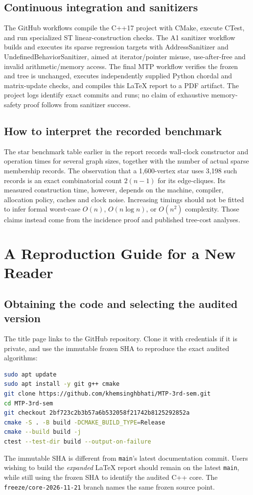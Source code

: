 \subsection{Continuous integration and sanitizers}
The GitHub workflows compile the C++17 project with CMake, execute CTest, and run specialized ST linear-construction checks.  The A1 sanitizer workflow builds and executes its sparse regression targets with AddressSanitizer and UndefinedBehaviorSanitizer, aimed at iterator/pointer misuse, use-after-free and invalid arithmetic/memory access.  The final MTP workflow verifies the frozen  and  tree is unchanged, executes independently supplied Python chordal and matrix-update checks, and compiles this LaTeX report to a PDF artifact.  The project logs identify exact commits and runs; no claim of exhaustive memory-safety proof follows from sanitizer success.

\subsection{How to interpret the recorded benchmark}
The star benchmark table earlier in the report records wall-clock constructor and operation times for several graph sizes, together with the number of actual sparse membership records.  The observation that a 1,600-vertex star uses 3,198 such records is an exact combinatorial count \(2(n-1)\) for its edge-cliques.  Its measured construction time, however, depends on the machine, compiler, allocation policy, caches and clock noise.  Increasing timings should not be fitted to infer formal worst-case \(O(n)\), \(O(n\log n)\), or \(O(n^2)\) complexity.  Those claims instead come from the incidence proof and published tree-cost analyses.

\section{A Reproduction Guide for a New Reader}
\label{sec:reproduce-full}
\subsection{Obtaining the code and selecting the audited version}
The title page links to the GitHub repository.  Clone it with credentials if it is private, and use the immutable frozen SHA to reproduce the exact audited algorithms:
\begin{lstlisting}[language=bash,caption={Build the frozen implementation on Ubuntu.}]
sudo apt update
sudo apt install -y git g++ cmake
git clone https://github.com/khemsinghbhati/MTP-3rd-sem.git
cd MTP-3rd-sem
git checkout 2bf723c2b3b57a6b532058f21742b8125292852a
cmake -S . -B build -DCMAKE_BUILD_TYPE=Release
cmake --build build -j
ctest --test-dir build --output-on-failure
\end{lstlisting}
The immutable SHA is different from \texttt{main}'s latest documentation commit.  Users wishing to build the \emph{expanded} LaTeX report should remain on the latest \texttt{main}, while still using the frozen SHA to identify the audited C++ core.  The \texttt{freeze/core-2026-11-21} branch names the same frozen source point.

